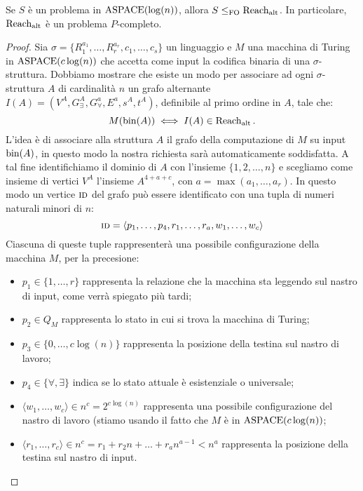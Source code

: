 \begin{proposizione}
 Se $S$ è un problema in $\operatorname{ASPACE}(\log(n))$, allora $S \leq_{\operatorname{FO}} \operatorname{Reach_{alt}}$.
 In particolare, $\operatorname{Reach_{alt}}$ è un problema $P$-completo.
\end{proposizione}
\begin{proof}
 Sia $\sigma = \{R^{a_1}_1,\ldots,R^{a_r}_r,c_1, \ldots, c_s\}$ un linguaggio
 e $M$ una macchina di Turing in $\operatorname{ASPACE}(c \log(n))$ che accetta come input
 la codifica binaria di una $\sigma$-struttura. Dobbiamo mostrare che esiste un
 modo per associare ad ogni $\sigma$-struttura $A$ di cardinalità $n$ un grafo alternante
 $I(A) = (V^A, G_\exists^A, G_\forall^a, E^a, s^A,t^A)$,
 definibile al primo ordine in $A$, tale che:
 \[ M(\operatorname{bin}(A)) \iff I(A) \in \operatorname{Reach_{alt}}. \]
 L'idea è di associare alla struttura $A$ il grafo della computazione
 di $M$ su input $\operatorname{bin}(A)$, in questo modo la nostra richiesta sarà
 automaticamente soddisfatta.
 A tal fine identifichiamo il dominio di $A$ con l'insieme $\{1,2,\ldots, n\}$ e
 scegliamo come insieme di vertici $V^A$ l'insieme $A^{4+a+c}$,
 con $a=\max(a_1, \ldots, a_r)$. In questo modo
 un vertice $\textsc{id}$ del grafo può essere identificato con una tupla di numeri naturali
 minori di $n$:
 \[\textsc{id}=\langle p_1, \ldots, p_4, r_1, \ldots, r_a, w_1, \ldots, w_c \rangle\]
 Ciascuna di queste tuple rappresenterà una possibile configurazione della
 macchina $M$, per la precesione:
 \begin{itemize}
  \item $p_1 \in \{1,\ldots, r\}$ rappresenta la relazione che la
  macchina sta leggendo sul nastro di input, come verrà spiegato più tardi;
  \item $p_2 \in Q_M$ rappresenta lo stato in cui si trova la macchina di Turing;
  \item $p_3 \in \{0, \ldots, c \log(n)\}$ rappresenta la posizione della testina
  sul nastro di lavoro;
  \item $p_4 \in \{\forall, \exists\}$ indica se lo stato attuale è esistenziale
  o universale;
  \item $\langle w_1, \ldots, w_c \rangle \in n^c = 2^{c \log (n)}$ rappresenta
  una possibile configurazione del nastro di lavoro (stiamo usando
  il fatto che $M$ è in $\operatorname{ASPACE}(c \log(n))$;
  \item $\langle r_1, \ldots, r_c \rangle \in n^c = r_1 + r_2 n + \ldots + r_a n^{a-1} < n^a$
  rappresenta la posizione della testina sul nastro di input.
 \end{itemize}
  

\end{proof}
